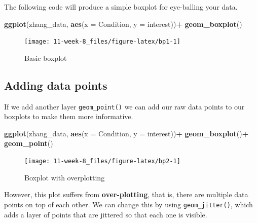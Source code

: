 \documentclass[]{book}
\newenvironment{Shaded}{\begin{snugshade}}{\end{snugshade}}
\newcommand{\DataTypeTok}[1]{\textcolor[rgb]{0.13,0.29,0.53}{#1}}
\newcommand{\KeywordTok}[1]{\textcolor[rgb]{0.13,0.29,0.53}{\textbf{#1}}}
\newcommand{\NormalTok}[1]{#1}
\newcommand{\OperatorTok}[1]{\textcolor[rgb]{0.81,0.36,0.00}{\textbf{#1}}}
\newcommand{\StringTok}[1]{\textcolor[rgb]{0.31,0.60,0.02}{#1}}
\begin{document}
The following code will produce a simple boxplot for eye-balling your data.

\begin{Shaded}
\begin{Highlighting}[]
\KeywordTok{ggplot}\NormalTok{(zhang_data, }\KeywordTok{aes}\NormalTok{(}\DataTypeTok{x =}\NormalTok{ Condition, }\DataTypeTok{y =}\NormalTok{ interest))}\OperatorTok{+}
\StringTok{  }\KeywordTok{geom_boxplot}\NormalTok{()}
\end{Highlighting}
\end{Shaded}

\begin{figure}

{\centering \texttt{[image: 11-week-8\_files/figure-latex/bp1-1]} 

}

\caption{Basic boxplot}\label{fig:bp1}
\end{figure}

\hypertarget{adding-data-points}{%
\subsection{Adding data points}\label{adding-data-points}}

If we add another layer \texttt{geom\_point()} we can add our raw data points to our boxplots to make them more informative.

\begin{Shaded}
\begin{Highlighting}[]
\KeywordTok{ggplot}\NormalTok{(zhang_data, }\KeywordTok{aes}\NormalTok{(}\DataTypeTok{x =}\NormalTok{ Condition, }\DataTypeTok{y =}\NormalTok{ interest))}\OperatorTok{+}
\StringTok{  }\KeywordTok{geom_boxplot}\NormalTok{()}\OperatorTok{+}
\StringTok{  }\KeywordTok{geom_point}\NormalTok{()}
\end{Highlighting}
\end{Shaded}

\begin{figure}

{\centering \texttt{[image: 11-week-8\_files/figure-latex/bp2-1]} 

}

\caption{Boxplot with overplotting}\label{fig:bp2}
\end{figure}

However, this plot suffers from \textbf{over-plotting}, that is, there are multiple data points on top of each other. We can change this by using \texttt{geom\_jitter()}, which adds a layer of points that are jittered so that each one is visible.
\end{document}
